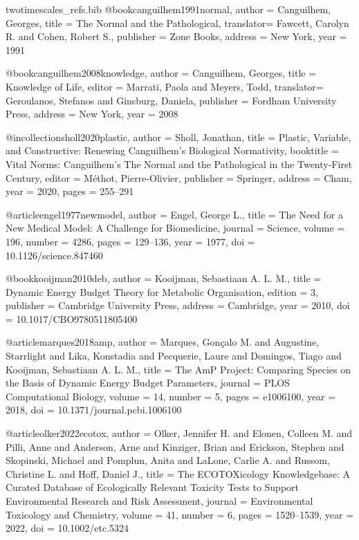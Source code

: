 
\begin{filecontents*}{twotimescales_refs.bib}
@book{canguilhem1991normal,
  author    = {Canguilhem, Georges},
  title     = {The Normal and the Pathological},
  translator= {Fawcett, Carolyn R. and Cohen, Robert S.},
  publisher = {Zone Books},
  address   = {New York},
  year      = {1991}
}

@book{canguilhem2008knowledge,
  author    = {Canguilhem, Georges},
  title     = {Knowledge of Life},
  editor    = {Marrati, Paola and Meyers, Todd},
  translator= {Geroulanos, Stefanos and Ginsburg, Daniela},
  publisher = {Fordham University Press},
  address   = {New York},
  year      = {2008}
}

@incollection{sholl2020plastic,
  author    = {Sholl, Jonathan},
  title     = {Plastic, Variable, and Constructive: Renewing Canguilhem's Biological Normativity},
  booktitle = {Vital Norms: Canguilhem's The Normal and the Pathological in the Twenty-First Century},
  editor    = {M{\'e}thot, Pierre-Olivier},
  publisher = {Springer},
  address   = {Cham},
  year      = {2020},
  pages     = {255--291}
}

@article{engel1977newmodel,
  author  = {Engel, George L.},
  title   = {The Need for a New Medical Model: A Challenge for Biomedicine},
  journal = {Science},
  volume  = {196},
  number  = {4286},
  pages   = {129--136},
  year    = {1977},
  doi     = {10.1126/science.847460}
}

@book{kooijman2010deb,
  author    = {Kooijman, Sebastiaan A. L. M.},
  title     = {Dynamic Energy Budget Theory for Metabolic Organisation},
  edition   = {3},
  publisher = {Cambridge University Press},
  address   = {Cambridge},
  year      = {2010},
  doi       = {10.1017/CBO9780511805400}
}

@article{marques2018amp,
  author  = {Marques, Gon{\c{c}}alo M. and Augustine, Starrlight and Lika, Konstadia and Pecquerie, Laure and Domingos, Tiago and Kooijman, Sebastiaan A. L. M.},
  title   = {The AmP Project: Comparing Species on the Basis of Dynamic Energy Budget Parameters},
  journal = {PLOS Computational Biology},
  volume  = {14},
  number  = {5},
  pages   = {e1006100},
  year    = {2018},
  doi     = {10.1371/journal.pcbi.1006100}
}

@article{olker2022ecotox,
  author  = {Olker, Jennifer H. and Elonen, Colleen M. and Pilli, Anne and Anderson, Arne and Kinziger, Brian and Erickson, Stephen and Skopinski, Michael and Pomplun, Anita and LaLone, Carlie A. and Russom, Christine L. and Hoff, Daniel J.},
  title   = {The ECOTOXicology Knowledgebase: A Curated Database of Ecologically Relevant Toxicity Tests to Support Environmental Research and Risk Assessment},
  journal = {Environmental Toxicology and Chemistry},
  volume  = {41},
  number  = {6},
  pages   = {1520--1539},
  year    = {2022},
  doi     = {10.1002/etc.5324}
}


\end{filecontents*}
